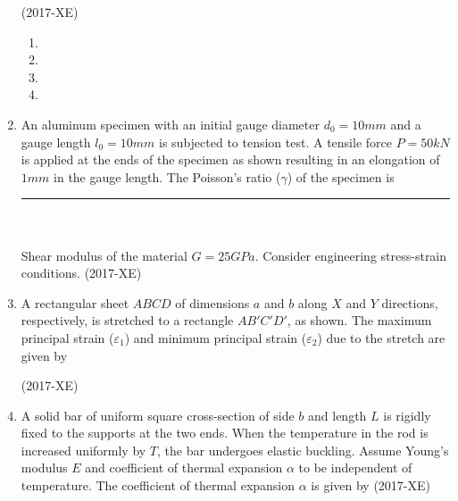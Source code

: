 \documentclass[journal]{IEEEtran}
\begin{document}
\begin{enumerate}
\hfill(2017-XE)

\begin{enumerate}
    \item 
    \item 
    \item 
    \item 
\end{enumerate}
\item An aluminum specimen with an initial gauge diameter $d_0 = 10mm$ and a gauge length $l_0 = 10mm$ is subjected to tension test. A tensile force $P = 50kN$ is applied at the ends of the specimen as shown resulting in an elongation of $1mm$ in the gauge length. The Poisson's ratio ($\gamma$) of the specimen is \rule{2cm}{0.4pt}\\ \\
Shear modulus of the material $G = 25GPa$. Consider engineering stress-strain conditions. \hfill(2017-XE)

\item A rectangular sheet $ABCD$ of dimensions $a$ and $b$ along $X$ and $Y$ directions, respectively, is stretched to a rectangle $AB'C'D'$, as shown. The maximum principal strain ($\varepsilon_1$) and minimum principal strain ($\varepsilon_2$) due to the stretch are given by

\hfill(2017-XE)

\begin{enumerate}
\end{enumerate}
\item A solid bar of uniform square cross-section of side $b$ and length $L$ is rigidly fixed to the supports at the two ends. When the temperature in the rod is increased uniformly by $T$, the bar undergoes elastic buckling. Assume Young's modulus $E$ and coefficient of thermal expansion $\alpha$ to be independent of temperature. The coefficient of thermal expansion $\alpha$ is given by \hfill(2017-XE)
\begin{enumerate}
\end{enumerate}
\end{enumerate}
\end{document}
